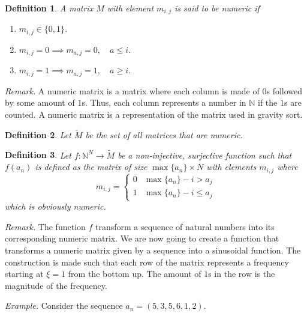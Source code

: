 \documentclass{article}
\newtheorem{definition}{Definition}[section]
\begin{document}
\begin{definition}
    A matrix \(M\) with element \(m_{i,j}\) is said to be \textit{numeric} if
    \begin{enumerate}
        \item \(m_{i,j} \in \{0,1\}\).
        \item \(m_{i,j} = 0 \implies m_{a,j} = 0, \quad a \leq i \).
        \item \(m_{i,j} = 1 \implies m_{a,j} = 1, \quad a \geq i \).
    \end{enumerate}
\end{definition}

\textit{Remark.} A numeric matrix is a matrix where each column is made of \(0\)s followed by
some amount of \(1\)s. Thus, each column represents a number in \(\mathbb{N}\)
if the \(1\)s are counted.
A numeric matrix is a representation of the matrix used in gravity sort.

\begin{definition}
    Let \(\tilde{M}\) be the set of all matrices that are numeric.
\end{definition}

\begin{definition}
    Let \(f\colon {\mathbb{N}}^N \to \tilde{M}\) be a non-injective, surjective function
    such that \(f(a_n)\) is defined as the matrix of size \(\max\{a_n\} \times N\)
    with elements \(m_{i,j}\) where
    \[
        m_{i,j} =
        \begin{cases}
            0 & \max\{a_n\} - i > a_j \\
            1 & \max\{a_n\} - i \leq a_j
        \end{cases}
    \]
    which is obviously numeric.
\end{definition}

\textit{Remark.} The function \(f\) transform a sequence of natural numbers into its corresponding
numeric matrix. We are now going to create a function that transforms 
a numeric matrix given by a sequence into a sinusoidal function.
The construction is made such that each row of the matrix represents a frequency
starting at \(\xi=1\) from the bottom up. The amount of \(1\)s in the row
is the magnitude of the frequency.

\textit{Example.} Consider the sequence \(a_n = (5,3,5,6,1,2)\).
\end{document}
